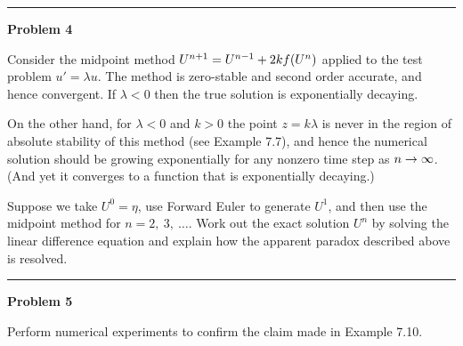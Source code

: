 \documentclass[10pt]{article}
\begin{document}


\vskip 1cm
\hrule
{\bf Problem 4}

Consider the midpoint method $U^{n+1} = U^{n-1} + 2kf(U^n)$ applied to the test
problem $u' = \lambda u$.  The method is zero-stable and second order
accurate, and hence convergent.  If $\lambda<0$ then the true solution
is exponentially decaying.

On the other hand, for $\lambda<0$ and $k>0$ the point $z=k\lambda$ is never
in the region of absolute stability of this method (see Example 7.7),
and hence the numerical solution should be growing exponentially for any
nonzero time step as $n\rightarrow\infty$.  
(And yet it converges to a function that is exponentially decaying.)

Suppose we take $U^0=\eta$, use Forward Euler to generate $U^1$, and then
use the midpoint method for $n=2,~3,~\ldots$.  Work out the exact solution
$U^n$ by solving the linear difference equation and explain how the apparent
paradox described above is resolved.






\vskip 1cm
\hrule
{\bf Problem 5}


Perform numerical experiments to confirm the claim made in Example 7.10.



\end{document}
